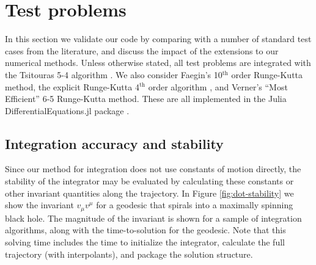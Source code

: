 \documentclass[fleqn,usenatbib]{mnras}
\begin{document}
\section{Test problems}
\label{sec:test-problems}

In this section we validate our code by comparing with a number of standard
test cases from the literature, and discuss the impact of the extensions to our
numerical methods.
Unless otherwise stated, all test problems are integrated with the Tsitouras 5-4
algorithm \citep{tsitouras_rungekutta_2011}. We also consider Faegin's
10$^\text{th}$ order Runge-Kutta method, the explicit Runge-Kutta 4$^\text{th}$
order algorithm \citep{press_numerical_2007}, and Verner's ``Most Efficient''
6-5 Runge-Kutta method.  These are all implemented in the Julia
DifferentialEquations.jl package \citep{rackauckas_differential_2017}.

\subsection{Integration accuracy and stability}

Since our method for integration does not use constants of motion directly, the
stability of the integrator may be evaluated by calculating these constants or
other invariant quantities along the trajectory. In Figure
\ref{fig:dot-stability} we show the invariant $v_\mu v^\mu$ for a geodesic that
spirals into a maximally spinning black hole. The magnitude of the invariant is
shown for a sample of integration algorithms, along with the time-to-solution
for the geodesic. Note that this solving time includes the time to initialize the
integrator, calculate the full trajectory (with interpolants), and package the
solution structure.
\end{document}
